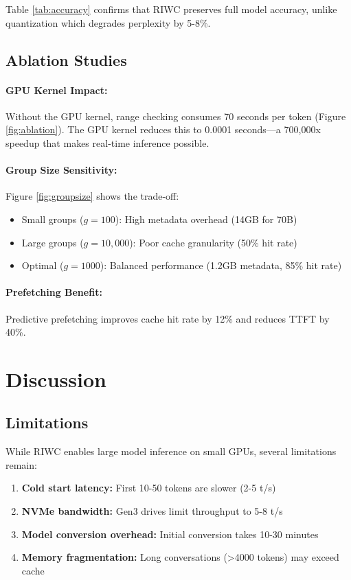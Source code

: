 \documentclass[twocolumn,10pt]{article}
\begin{document}
Table \ref{tab:accuracy} confirms that RIWC preserves full model accuracy, unlike quantization which degrades perplexity by 5-8\%.

\subsection{Ablation Studies}

\paragraph{GPU Kernel Impact:} Without the GPU kernel, range checking consumes 70 seconds per token (Figure \ref{fig:ablation}). The GPU kernel reduces this to 0.0001 seconds—a 700,000x speedup that makes real-time inference possible.

\paragraph{Group Size Sensitivity:} Figure \ref{fig:groupsize} shows the trade-off:

\begin{itemize}
    \item Small groups ($g=100$): High metadata overhead (14GB for 70B)
    \item Large groups ($g=10,000$): Poor cache granularity (50\% hit rate)
    \item Optimal ($g=1000$): Balanced performance (1.2GB metadata, 85\% hit rate)
\end{itemize}

\paragraph{Prefetching Benefit:} Predictive prefetching improves cache hit rate by 12\% and reduces TTFT by 40\%.

\section{Discussion}

\subsection{Limitations}

While RIWC enables large model inference on small GPUs, several limitations remain:

\begin{enumerate}
    \item \textbf{Cold start latency:} First 10-50 tokens are slower (2-5 t/s)
    \item \textbf{NVMe bandwidth:} Gen3 drives limit throughput to 5-8 t/s
    \item \textbf{Model conversion overhead:} Initial conversion takes 10-30 minutes
    \item \textbf{Memory fragmentation:} Long conversations (>4000 tokens) may exceed cache
\end{enumerate}
\end{document}
